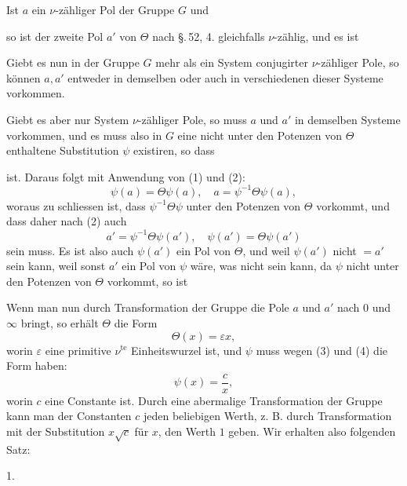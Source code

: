 
Ist $a$ ein $\nu$-zähliger Pol der Gruppe $G$ und


so ist der zweite Pol $a'$ von $\Theta$ nach \S.\,52, 4. gleichfalls $\nu$-zählig,
und es ist


Giebt es nun in der Gruppe $G$ mehr als ein System conjugirter
$\nu$-zähliger Pole, so können $a, a'$ entweder in demselben
oder auch in verschiedenen dieser Systeme vorkommen.

Giebt es aber nur  System $\nu$-zähliger Pole, so muss $a$
und $a'$ in demselben Systeme vorkommen, und es muss also in $G$
eine nicht unter den Potenzen von $\Theta$ enthaltene Substitution $\psi$
existiren, so dass


ist. Daraus folgt mit Anwendung von (1) und (2):
\[
\psi(a) = \Theta\psi(a), \quad a = \psi^{-1}\Theta\psi(a),
\]
woraus zu schliessen ist, dass $\psi^{-1}\Theta\psi$ unter den Potenzen von
$\Theta$ vorkommt, und dass daher nach (2) auch
\[
a' = \psi^{-1}\Theta\psi(a'), \quad \psi(a') = \Theta\psi(a')
\]
sein muss. Es ist also auch $\psi(a')$ ein Pol von $\Theta$, und weil $\psi(a')$
nicht $= a'$ sein kann, weil sonst $a'$ ein Pol von $\psi$ wäre, was
nicht sein kann, da $\psi$ nicht unter den Potenzen von $\Theta$ vorkommt,
so ist


Wenn man nun durch Transformation der Gruppe die Pole
$a$ und $a'$ nach $0$ und $\infty$ bringt, so erhält $\Theta$ die Form
\[
\Theta(x) = \varepsilon x,
\]
worin $\varepsilon$ eine primitive $\nu^{\text{te}}$ Einheitswurzel ist, und $\psi$ muss wegen
(3) und (4) die Form haben:
\[
\psi(x) = \frac{c}{x},
\]
worin $c$ eine Constante ist. Durch eine abermalige Transformation
der Gruppe kann man der Constanten $c$ jeden beliebigen Werth,
z. B. durch Transformation mit der Substitution $x\sqrt{c}$ für $x$, den
Werth $1$ geben. Wir erhalten also folgenden Satz:

1.~
